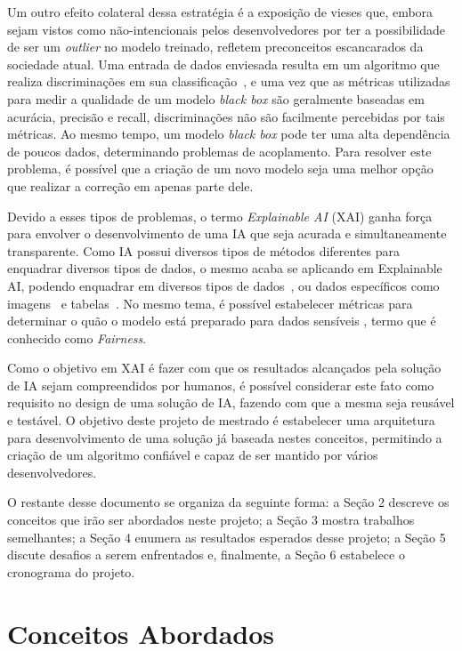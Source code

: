 \documentclass[portugues, 12pt, a4paper]{article}
\begin{document}
Um outro efeito colateral dessa estratégia é a exposição de vieses que, embora sejam vistos como não-intencionais pelos desenvolvedores por ter a possibilidade de ser um \textit{outlier} no modelo treinado, refletem preconceitos escancarados da sociedade atual. Uma entrada de dados enviesada resulta em um algoritmo que realiza discriminações em sua classificação~\citep{Buolamwini_2018}, e uma vez que as métricas utilizadas para medir a qualidade de um modelo \textit{black box} são geralmente baseadas em acurácia, precisão e recall, discriminações não são facilmente percebidas por tais métricas. Ao mesmo tempo, um modelo \textit{black box} pode ter uma alta dependência de poucos dados, determinando problemas de acoplamento. Para resolver este problema, é possível que a criação de um novo modelo seja uma melhor opção que realizar a correção em apenas parte dele.

Devido a esses tipos de problemas, o termo \textit{Explainable AI} (XAI) ganha força para envolver o desenvolvimento de uma IA que seja acurada e simultaneamente transparente. Como IA possui diversos tipos de métodos diferentes para enquadrar diversos tipos de dados, o mesmo acaba se aplicando em Explainable AI, podendo enquadrar em diversos tipos de dados~\citep{Sundararajan_2017}, ou dados específicos como imagens~\citep{Kapishnikov_2019} e tabelas~\citep{Maleki_2013}. No mesmo tema, é possível estabelecer métricas para determinar o quão o modelo está preparado para dados sensíveis \citep{Begley_2021}, termo que é conhecido como \textit{Fairness}.

Como o objetivo em XAI é fazer com que os resultados alcançados pela solução de IA sejam compreendidos por humanos, é possível considerar este fato como requisito no design de uma solução de IA, fazendo com que a mesma seja reusável e testável. O objetivo deste projeto de mestrado é estabelecer uma arquitetura para desenvolvimento de uma solução já baseada nestes conceitos, permitindo a criação de um algoritmo confiável e capaz de ser mantido por vários desenvolvedores.

O restante desse documento se organiza da seguinte forma: a Seção 2 descreve os conceitos que irão ser abordados neste projeto; a Seção 3 mostra trabalhos semelhantes; a Seção 4 enumera as resultados esperados desse projeto; a Seção 5 discute desafios a serem enfrentados e, finalmente, a Seção 6 estabelece o cronograma do projeto.

\section{Conceitos Abordados}
\end{document}
